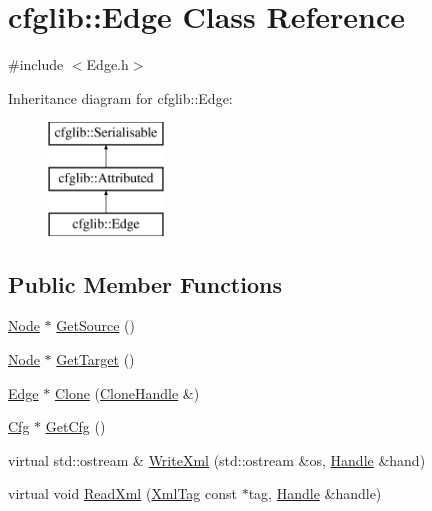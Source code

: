 \hypertarget{classcfglib_1_1Edge}{}\section{cfglib\+:\+:Edge Class Reference}
\label{classcfglib_1_1Edge}


{\ttfamily \#include $<$Edge.\+h$>$}

Inheritance diagram for cfglib\+:\+:Edge\+:\begin{figure}[H]
\begin{center}
\leavevmode
\includegraphics[height=3.000000cm]{classcfglib_1_1Edge}
\end{center}
\end{figure}
\subsection*{Public Member Functions}
\begin{DoxyCompactItemize}
\item 
\hyperlink{classcfglib_1_1Node}{Node} $\ast$ \hyperlink{classcfglib_1_1Edge_a217bd00a0276e3753ad8e34c2e57de44}{Get\+Source} ()
\item 
\hyperlink{classcfglib_1_1Node}{Node} $\ast$ \hyperlink{classcfglib_1_1Edge_ac5af20f98b5f5ceaad6383f1a953cc4e}{Get\+Target} ()
\item 
\hyperlink{classcfglib_1_1Edge}{Edge} $\ast$ \hyperlink{classcfglib_1_1Edge_a63c1a3697beb4b1734455c92d647f04c}{Clone} (\hyperlink{classcfglib_1_1CloneHandle}{Clone\+Handle} \&)
\item 
\hyperlink{classcfglib_1_1Cfg}{Cfg} $\ast$ \hyperlink{classcfglib_1_1Edge_ae1359932ba4c4d3e5e20c0391561e6a8}{Get\+Cfg} ()
\item 
virtual std\+::ostream \& \hyperlink{classcfglib_1_1Edge_af65bccb04bf1bad3f8a99d0b279836e0}{Write\+Xml} (std\+::ostream \&os, \hyperlink{classcfglib_1_1Handle}{Handle} \&hand)
\item 
virtual void \hyperlink{classcfglib_1_1Edge_af7eb95612c30e993771c519a2240cd77}{Read\+Xml} (\hyperlink{classXmlTag}{Xml\+Tag} const $\ast$tag, \hyperlink{classcfglib_1_1Handle}{Handle} \&handle)
\end{DoxyCompactItemize}
